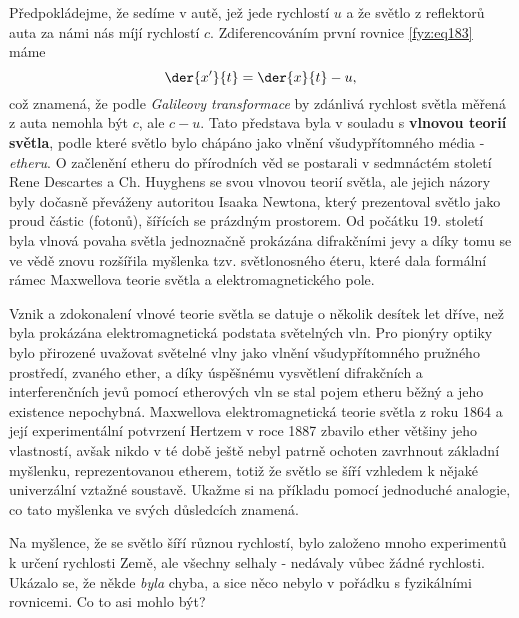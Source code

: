     Předpokládejme, že sedíme v autě, jež jede rychlostí \(u\) a že světlo z reflektorů auta za 
    námi nás míjí rychlostí \(c\). Zdiferencováním první rovnice \ref{fyz:eq183} máme
    \begin{equation}\label{fyz:eq184}
      \der{x'}{t} =\der{x}{t} - u, 
    \end{equation}       
    což znamená, že podle \emph{Galileovy transformace} by zdánlivá rychlost světla měřená z auta
    nemohla být \(c\), ale \(c-u\). Tato představa byla v souladu s \textbf{vlnovou teorií světla},
    podle které světlo bylo chápáno jako vlnění všudypřítomného média - \emph{etheru}.  O začlenění
    etheru do přírodních věd se postarali v sedmnáctém století Rene Descartes a Ch. Huyghens se svou
    vlnovou teorií světla, ale jejich názory byly dočasně převáženy autoritou Isaaka Newtona, který
    prezentoval světlo jako proud částic (fotonů), šířících se prázdným prostorem. Od počátku 19.
    století byla vlnová povaha světla jednoznačně prokázána difrakčními jevy a díky tomu se ve vědě
    znovu rozšířila myšlenka tzv. světlonosného éteru, které dala formální rámec Maxwellova teorie
    světla a elektromagnetického pole.  
    
    \begin{tcnote}        
      Vznik a zdokonalení vlnové teorie světla se datuje o několik desítek let dříve, než byla
      prokázána elektromagnetická podstata světelných vln. Pro pionýry optiky bylo přirozené
      uvažovat světelné vlny jako vlnění všudypřítomného pružného prostředí, zvaného ether, a díky
      úspěšnému vysvětlení difrakčních a interferenčních jevů pomocí etherových vln se stal pojem
      etheru běžný a jeho existence nepochybná. Maxwellova elektromagnetická teorie světla z roku
      1864 a její experimentální potvrzení Hertzem v roce 1887 zbavilo ether většiny jeho
      vlastností, avšak nikdo v té době ještě nebyl patrně ochoten zavrhnout základní myšlenku,
      reprezentovanou etherem, totiž že světlo se šíří vzhledem k nějaké univerzální vztažné
      soustavě. Ukažme si na příkladu pomocí jednoduché analogie, co tato myšlenka ve svých
      důsledcích znamená.
    \end{tcnote}

    Na myšlence, že se světlo šíří různou rychlostí, bylo založeno mnoho experimentů k určení
    rychlosti Země, ale všechny selhaly - nedávaly vůbec žádné rychlosti. Ukázalo se, že někde
    \emph{byla} chyba, a sice něco nebylo v pořádku s fyzikálními rovnicemi. Co to asi mohlo být?

